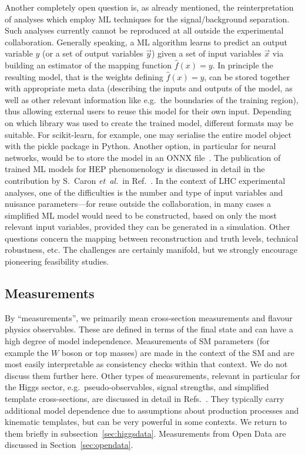 \documentclass[a4paper,aps,prd,longbibliography,notitlepage,showpacs,amsmath,amssymb,superscriptaddress,nofootinbib,floatfix,11pt,preprintnumbers]{revtex4-1-mod}
\newcommand{\python}{\textsf{Python}\xspace}
\newcommand{\eg}{e.g.\xspace}
\begin{document}
Another completely open question is, as already mentioned, the reinterpretation of analyses which employ ML techniques
for the signal/background separation. Such analyses currently cannot be reproduced at all outside the experimental collaboration.
Generally speaking, a ML algorithm learns to predict an output variable $y$ (or a set of output variables $\vec{y}$)  given a set of input variables $\vec{x}$ via building an estimator of the mapping function $\hat{f}(x)=y$.
In principle the resulting model, that is the weights defining $\hat{f}(x)=y$, can be stored together with appropriate meta data (describing the inputs and outputs of the model, as well as other relevant information like \eg~the boundaries of the training region), thus allowing external users to reuse this model for their own input.
Depending on which library was used to create the trained model, different formats may be suitable. For scikit-learn, for example, one may serialise the entire model object with the pickle package in \python. Another option, in particular for neural networks, would be to store the model in an \textsf{ONNX} file~\cite{Coccaro:2019lgs}. The publication of trained ML models for HEP phenomenology is discussed in detail in the contribution by S.~Caron \textit{et~al.}\ in Ref.~\cite{Brooijmans:2020yij}.
In the context of LHC experimental analyses, one of the difficulties is the number and type of input variables and nuisance parameters---for reuse outside the collaboration, in many cases a simplified ML model would need to be constructed, based on only the most relevant input variables, provided they can be generated in a simulation.  Other questions concern the mapping between reconstruction and truth levels, technical robustness, etc. The challenges are certainly manifold, but we strongly encourage pioneering feasibility studies.


\subsection{Measurements}  \label{sec:measurements}

By ``measurements'', we primarily mean cross-section measurements and flavour physics observables. These are defined in terms
of the final state and can have a high degree of model independence. Measurements of SM parameters (for example the $W$ boson or top masses) are made in the context of the SM and are most easily interpretable as consistency checks within that context. We do not discuss them further here. Other types of measurements, relevant in particular for the Higgs sector, \eg~pseudo-observables, signal strengths, and simplified template cross-sections, are discussed in detail in Refs.~\cite{Heinemeyer:2013tqa,deFlorian:2016spz}. They typically carry additional model dependence due to assumptions about production processes and kinematic templates, but can be very powerful in some contexts.
We return to them briefly in subsection~\ref{sec:higgsdata}. Measurements from Open Data are discussed in Section~\ref{sec:opendata}.
\end{document}
